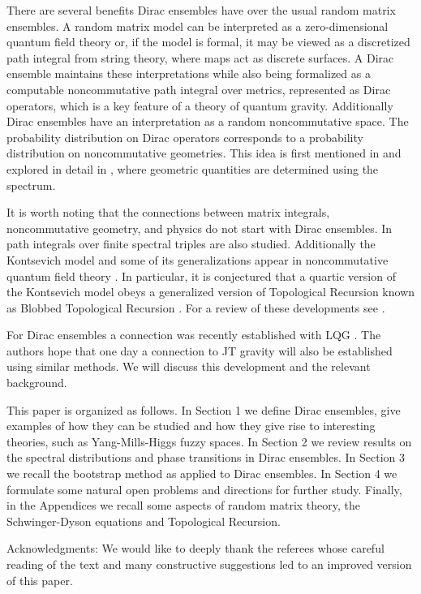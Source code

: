\documentclass[10pt]{article}
\begin{document}
There are several benefits Dirac ensembles have over the usual random matrix ensembles. A random matrix model can be interpreted as a zero-dimensional quantum field theory  or, if the model is formal, it may be viewed as a discretized path integral from string theory, where maps act as discrete surfaces. A Dirac ensemble maintains these interpretations while also being formalized as a computable noncommutative path integral over metrics, represented as Dirac operators, which is a key feature of a theory of quantum gravity. 
Additionally Dirac ensembles have an interpretation as a random noncommutative space. The probability distribution on Dirac operators corresponds to a probability distribution on noncommutative geometries. This idea is first mentioned in \cite{Barrett2016} and explored in detail in \cite{Spectral estimators}, where geometric quantities are determined using the spectrum. 

It is worth noting that the connections between matrix integrals, noncommutative geometry, and physics do not start with Dirac ensembles. In \cite{path integral finite ncg} path integrals over finite spectral triples are also studied. Additionally the Kontsevich model and some of its generalizations appear in noncommutative quantum field theory \cite{Quartic K 1,Quartic K 2, Quart K 3, Quartic K 4}. In particular, it is conjectured that a quartic version of the Kontsevich model obeys a generalized version of Topological Recursion known as Blobbed Topological Recursion \cite{blobbed1,blobbed2}. For a review of these developments see \cite{Quartic K review}.

For Dirac ensembles a connection was recently established with LQG \cite{HKP 2}. The authors hope that one day a connection to JT gravity will also be established using similar methods. We will discuss this development and the relevant background.

This paper is organized as follows. In Section 1 we define Dirac ensembles, give examples of how they can be studied and how they give rise to interesting theories, such as Yang-Mills-Higgs fuzzy spaces.
In Section 2 we review results on the spectral distributions and phase transitions in Dirac ensembles.
In Section 3 we recall the bootstrap method as applied to Dirac ensembles.
In Section 4 we formulate some natural open problems and directions for further study. Finally, in the Appendices we recall some aspects of random matrix theory, the Schwinger-Dyson equations and Topological Recursion.


Acknowledgments: We would like to deeply thank the referees whose careful reading of the text and many  constructive suggestions led to an improved version of this paper.
\end{document}
